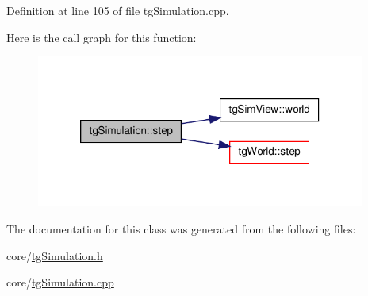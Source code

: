 Definition at line 105 of file tg\-Simulation.\-cpp.



Here is the call graph for this function\-:\nopagebreak
\begin{figure}[H]
\begin{center}
\leavevmode
\includegraphics[width=306pt]{classtg_simulation_a1e1b937fa359a501ab7ddd415b229c33_cgraph}
\end{center}
\end{figure}




The documentation for this class was generated from the following files\-:\begin{DoxyCompactItemize}
\item 
core/\hyperlink{tg_simulation_8h}{tg\-Simulation.\-h}\item 
core/\hyperlink{tg_simulation_8cpp}{tg\-Simulation.\-cpp}\end{DoxyCompactItemize}
